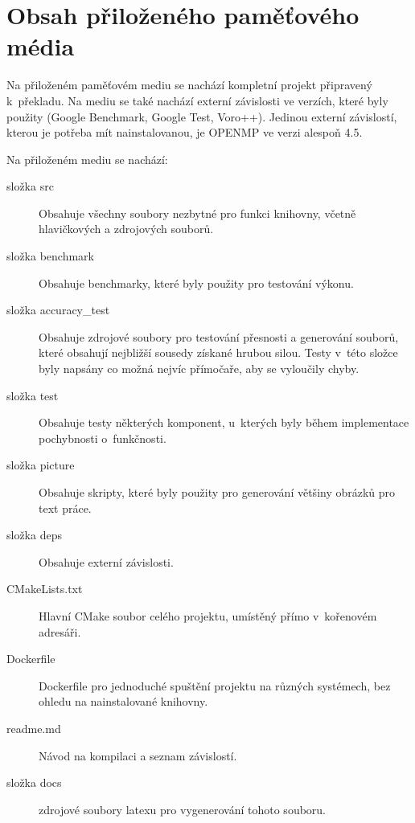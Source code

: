 
%

\chapter{Obsah přiloženého paměťového média}
Na přiloženém paměťovém mediu se nachází kompletní projekt připravený k~překladu. Na mediu se také nachází externí závislosti ve verzích, které byly použity (Google Benchmark, Google Test, Voro++). Jedinou externí závislostí, kterou je potřeba mít nainstalovanou, je OPENMP ve verzi alespoň 4.5.

Na přiloženém mediu se nachází:
\begin{description}
\item [složka src] Obsahuje všechny soubory nezbytné pro funkci knihovny, včetně hlavičkových a zdrojových souborů.
\item [složka benchmark] Obsahuje benchmarky, které byly použity pro testování výkonu.
\item [složka accuracy\_test] Obsahuje zdrojové soubory pro testování přesnosti a generování souborů, které obsahují nejbližší sousedy získané hrubou silou. Testy v~této složce byly napsány co možná nejvíc přímočaře, aby se vyloučily chyby.
\item [složka test] Obsahuje testy některých komponent, u~kterých byly během implementace pochybnosti o~funkčnosti.
\item [složka picture] Obsahuje skripty, které byly použity pro generování většiny obrázků pro text práce.
\item [složka deps] Obsahuje externí závislosti.
\item [CMakeLists.txt] Hlavní CMake soubor celého projektu, umístěný přímo v~kořenovém adresáři.
\item [Dockerfile] Dockerfile pro jednoduché spuštění projektu na různých systémech, bez ohledu na nainstalované knihovny.
\item [readme.md] Návod na kompilaci a seznam závislostí.
\item [složka docs] zdrojové soubory latexu pro vygenerování tohoto souboru.

\end{description}


